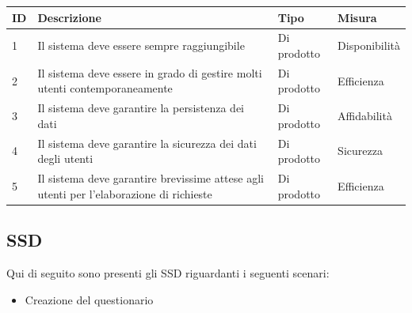 \documentclass[12pt]{article}
\begin{document}
\begin{table}[H]
\begin{adjustbox}{max width=1.1\textwidth,center}
\begin{tabular}{|l|l|l|l|}
\hline
\rowcolor[HTML]{3531FF} 
{\color[HTML]{FFFFFF} ID} & {\color[HTML]{FFFFFF} Descrizione}                                                      & {\color[HTML]{FFFFFF} Tipo} & {\color[HTML]{FFFFFF} Misura} \\ \hline
1                         & Il sistema deve essere sempre raggiungibile                                             & Di prodotto                 & Disponibilità                 \\ \hline
2                         & Il sistema deve essere in grado di gestire molti utenti contemporaneamente              & Di prodotto                 & Efficienza                    \\ \hline
3                         & Il sistema deve garantire la persistenza dei dati                                       & Di prodotto                 & Affidabilità                  \\ \hline
4                         & Il sistema deve garantire la sicurezza dei dati degli utenti                            & Di prodotto                 & Sicurezza                     \\ \hline
5                         & Il sistema deve garantire brevissime attese agli utenti per l'elaborazione di richieste & Di prodotto                 & Efficienza                    \\ \hline
\end{tabular}
\end{adjustbox}
\end{table}







\subsection{SSD}
Qui di seguito sono presenti gli SSD riguardanti i seguenti scenari:
\begin{itemize}
\item Creazione del questionario
\end{itemize}
\end{document}
